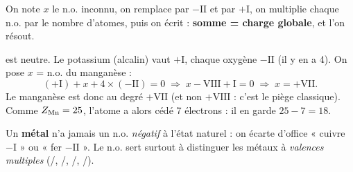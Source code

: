 \documentclass[11pt,a4paper]{article}
\begin{document}
\begin{methode}
On note $x$ le n.o. inconnu, on remplace  par $-\mathrm{II}$ et  par $+\mathrm{I}$, on multiplie
chaque n.o. par le nombre d'atomes, puis on écrit : \textbf{somme = charge globale}, et l'on résout.
\end{methode}

\begin{exemple}
 est neutre. Le potassium (alcalin) vaut $+\mathrm{I}$, chaque oxygène $-\mathrm{II}$
(il y en a 4). On pose $x$ = n.o. du manganèse :
\[ (+\mathrm{I}) + x + 4\times(-\mathrm{II}) = 0 \;\Longrightarrow\; x - \mathrm{VIII} + \mathrm{I}=0
   \;\Longrightarrow\; \boxed{x = +\mathrm{VII}}. \]
Le manganèse est donc au degré $+\mathrm{VII}$ (et non $+\mathrm{VIII}$ : c'est le piège classique). Comme
$Z_{\ce{Mn}}=25$, l'atome a alors cédé 7 électrons : il en garde $25-7=18$.
\end{exemple}

\begin{attention}
Un \textbf{métal} n'a jamais un n.o. \emph{négatif} à l'état naturel : on écarte d'office « cuivre $-\mathrm{I}$ »
ou « fer $-\mathrm{II}$ ». Le n.o. sert surtout à distinguer les métaux à \emph{valences multiples}
(/, /, /, /).
\end{attention}
\end{document}
